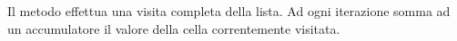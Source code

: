 
Il metodo effettua una visita completa della lista. Ad ogni iterazione somma ad un accumulatore il valore della cella correntemente visitata.

